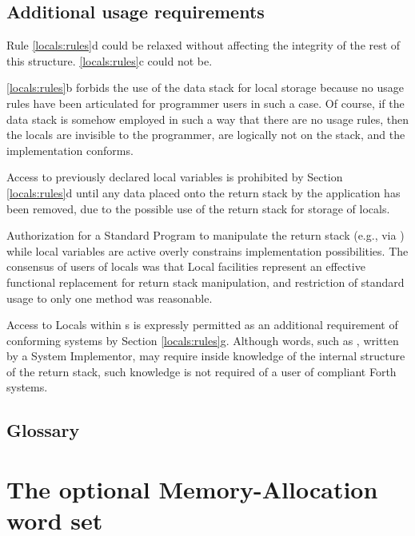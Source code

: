 \setcounter{subsection}{2}
\subsection{Additional usage requirements} %

Rule \ref{locals:rules}d could be relaxed without affecting the
integrity of the rest of this structure. \ref{locals:rules}c could
not be.

\ref{locals:rules}b forbids the use of the data stack for local
storage because no usage rules have been articulated for programmer
users in such a case. Of course, if the data stack is somehow employed
in such a way that there are no usage rules, then the locals are
invisible to the programmer, are logically not on the stack, and the
implementation conforms.

Access to previously declared local variables is prohibited by Section
\ref{locals:rules}d until any data placed onto the return stack by the
application has been removed, due to the possible use of the return
stack for storage of locals.

Authorization for a Standard Program to manipulate the return stack
(e.g., via  ) while local variables
are active overly constrains implementation possibilities. The consensus
of users of locals was that Local facilities represent an effective
functional replacement for return stack manipulation, and restriction
of standard usage to only one method was reasonable.

Access to Locals within s is
expressly permitted as an additional requirement of conforming systems
by Section \ref{locals:rules}g. Although words, such as ,
written by a System Implementor, may require inside knowledge of the
internal structure of the return stack, such knowledge is not required
of a user of compliant Forth systems.

\setcounter{subsection}{5}
\subsection{Glossary} %



\section{The optional Memory-Allocation word set} %
\label{rat:memory}

